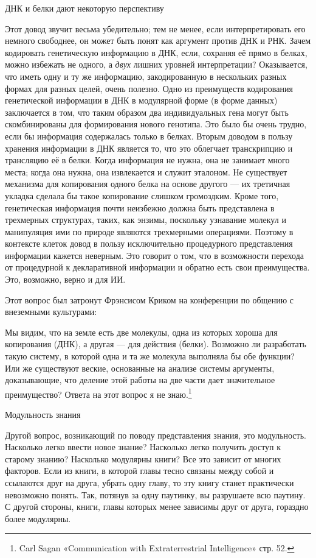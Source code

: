 \documentclass[../main.tex]{subfiles}
\begin{document}
ДНК и белки дают некоторую перспективу

Этот довод звучит весьма убедительно; тем не менее, если интерпретировать его немного свободнее, он может быть понят как аргумент против ДНК и РНК\@. Зачем кодировать генетическую информацию в ДНК, если, сохраняя её прямо в белках, можно избежать не одного, а \emph{двух} лишних уровней интерпретации? Оказывается, что иметь одну и ту же информацию, закодированную в нескольких разных формах для разных целей, очень полезно. Одно из преимуществ кодирования генетической информации в ДНК в модулярной форме (в форме данных) заключается в том, что таким образом два индивидуальных гена могут быть скомбинированы для формирования нового генотипа. Это было бы очень трудно, если бы информация содержалась только в белках. Вторым доводом в пользу хранения информации в ДНК является то, что это облегчает транскрипцию и трансляцию её в белки. Когда информация не нужна, она не занимает много места; когда она нужна, она извлекается и служит эталоном. Не существует механизма для копирования одного белка на основе другого --- их третичная укладка сделала бы такое копирование слишком громоздким. Кроме того, генетическая информация почти неизбежно должна быть представлена в трехмерных структурах, таких, как энзимы, поскольку узнавание молекул и манипуляция ими по природе являются трехмерными операциями. Поэтому в контексте клеток довод в пользу исключительно процедурного представления информации кажется неверным. Это говорит о том, что в возможности перехода от процедурной к декларативной информации и обратно есть свои преимущества. Это, возможно, верно и для ИИ.

Этот вопрос был затронут Фрэнсисом Криком на конференции по общению с внеземными культурами:

Мы видим, что на земле есть две молекулы, одна из которых хороша для копирования (ДНК), а другая --- для действия (белки). Возможно ли разработать такую систему, в которой одна и та же молекула выполняла бы обе функции? Или же существуют веские, основанные на анализе системы аргументы, доказывающие, что деление этой работы на две части дает значительное преимущество? Ответа на этот вопрос я не знаю.\footnote{Carl Sagan «Communication with Extraterrestrial Intelligence» стр. 52.}

Модульность знания

Другой вопрос, возникающий по поводу представления знания, это модульность. Насколько легко ввести новое знание? Насколько легко получить доступ к старому знанию? Насколько модулярны книги? Все это зависит от многих факторов. Если из книги, в которой главы тесно связаны между собой и ссылаются друг на друга, убрать одну главу, то эту книгу станет практически невозможно понять. Так, потянув за одну паутинку, вы разрушаете всю паутину. С другой стороны, книги, главы которых менее зависимы друг от друга, гораздно более модулярны.
\end{document}
